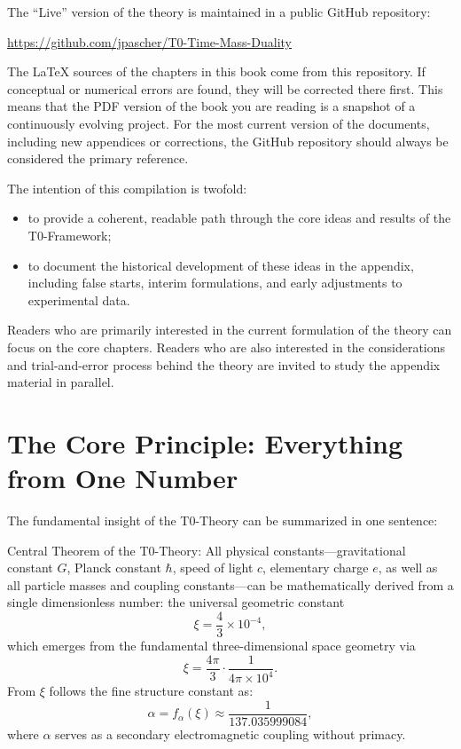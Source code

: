 	The ``Live'' version of the theory is maintained in a public GitHub repository:
	\begin{center}
		\url{https://github.com/jpascher/T0-Time-Mass-Duality}
	\end{center}
	
	The \LaTeX{} sources of the chapters in this book come from this repository. If conceptual or numerical errors are found, they will be corrected there first. This means that the PDF version of the book you are reading is a snapshot of a continuously evolving project. For the most current version of the documents, including new appendices or corrections, the GitHub repository should always be considered the primary reference.
	
	The intention of this compilation is twofold:
	\begin{itemize}
		\item to provide a coherent, readable path through the core ideas and results of the T0-Framework;
		\item to document the historical development of these ideas in the appendix, including false starts, interim formulations, and early adjustments to experimental data.
	\end{itemize}
	
	Readers who are primarily interested in the current formulation of the theory can focus on the core chapters. Readers who are also interested in the considerations and trial-and-error process behind the theory are invited to study the appendix material in parallel.
	
	\section{The Core Principle: Everything from One Number}
	The fundamental insight of the T0-Theory can be summarized in one sentence:
	
	\begin{keyresult}
		Central Theorem of the T0-Theory: All physical constants—gravitational constant $G$, Planck constant $\hbar$, speed of light $c$, elementary charge $e$, as well as all particle masses and coupling constants—can be mathematically derived from a single dimensionless number: the universal geometric constant
		\[
		\xi = \frac{4}{3} \times 10^{-4},
		\]
		which emerges from the fundamental three-dimensional space geometry via
		\[
		\xi = \frac{4\pi}{3} \cdot \frac{1}{4\pi \times 10^4}.
		\]
		From $\xi$ follows the fine structure constant as:
		\[
		\alpha = f_\alpha(\xi) \approx \frac{1}{137.035999084},
		\]
		where $\alpha$ serves as a secondary electromagnetic coupling without primacy.
	\end{keyresult}
	

